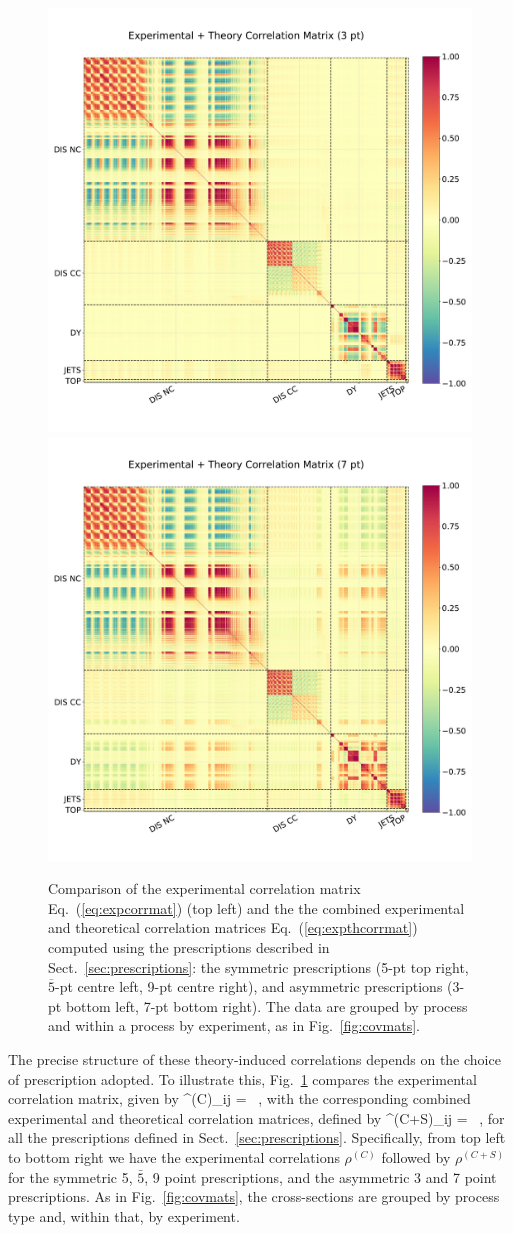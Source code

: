 \begin{figure}[htb!]
\begin{center}
\vskip-0.5cm
\includegraphics[width=0.49\linewidth]{mhous/plots/expth_corrmat_3pt.pdf}
    \includegraphics[width=0.49\linewidth]{mhous/plots/expth_corrmat_7pt.pdf}
    \caption{\small Comparison of the experimental correlation matrix
      Eq.~(\ref{eq:expcorrmat}) (top left) and the
      the combined experimental and theoretical correlation matrices
      Eq.~(\ref{eq:expthcorrmat}) computed using the prescriptions described in Sect.~\ref{sec:prescriptions}: the symmetric prescriptions (5-pt top right, $\overline{5}$-pt centre left, 9-pt centre right), and asymmetric prescriptions (3-pt bottom left, 7-pt bottom right). The data are grouped by process and within a process by experiment, as in Fig.~\ref{fig:covmats}.
  \label{fig:corrmats} }
  \end{center}
\end{figure}

The precise structure of these theory-induced correlations depends
on the 
choice of prescription adopted.
%
To illustrate this, 
Fig.~\ref{fig:corrmats} compares the experimental correlation matrix, given by
\be
\label{eq:expcorrmat}
\rho^{(C)}_{ij} =  \, ,
\ee
with the corresponding combined experimental and theoretical correlation matrices, defined by
\be
\label{eq:expthcorrmat}
\rho^{(C+S)}_{ij} =  \, ,
\ee
for all the prescriptions defined in Sect.~\ref{sec:prescriptions}.
%
Specifically, from top left to bottom
right we have the experimental correlations $\rho^{(C)}$ followed by $\rho^{(C+S)}$ for the symmetric 5, $\bar{5}$, 9 point prescriptions, and the asymmetric 3 and 7 point prescriptions.
%
As in Fig.~\ref{fig:covmats},
the cross-sections are grouped by process type and, within that, by experiment.
%

